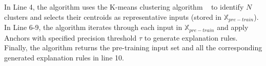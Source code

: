 In Line 4, the algorithm uses the K-means clustering algorithm ~\cite{kmeans} to identify $N$ clusters and selects their centroids as representative inputs (stored in $\mathbb{X}_{pre-train}$).
In Line 6-9, the algorithm iterates through each input in $\mathbb{X}_{pre-train}$ and apply Anchors with specified precision threshold $\tau$ to generate explanation rules.
Finally, the algorithm returns the pre-training input set and  all the corresponding generated explanation rules in line 10.



%
%
%
%

